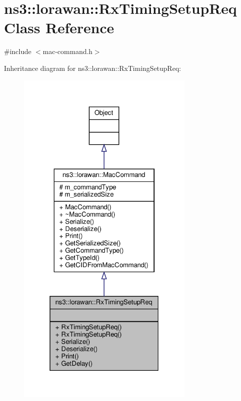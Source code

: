 \hypertarget{classns3_1_1lorawan_1_1RxTimingSetupReq}{}\section{ns3\+:\+:lorawan\+:\+:Rx\+Timing\+Setup\+Req Class Reference}
\label{classns3_1_1lorawan_1_1RxTimingSetupReq}


{\ttfamily \#include $<$mac-\/command.\+h$>$}



Inheritance diagram for ns3\+:\+:lorawan\+:\+:Rx\+Timing\+Setup\+Req\+:
\nopagebreak
\begin{figure}[H]
\begin{center}
\leavevmode
\includegraphics[width=244pt]{classns3_1_1lorawan_1_1RxTimingSetupReq__inherit__graph}
\end{center}
\end{figure}


